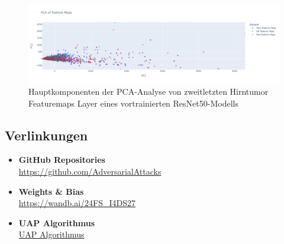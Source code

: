 \begin{figure}[H]
    \centering
    \includegraphics[width=\linewidth]{01-images/06-ending/brain-all-feautremap-pca-model-resnet50.png}
    \caption{Hauptkomponenten der PCA-Analyse von zweitletzten Hirntumor Featuremaps Layer eines vortrainierten ResNet50-Modells}
    \label{fig:brain-feautremap-pca-model-resnet50}
\end{figure}

\newpage

\subsection*{Verlinkungen}

\begin{itemize}

    \item \textbf{GitHub Repositories} \\
    \href{https://github.com/AdversarialAttacks}{https://github.com/AdversarialAttacks}
    
    \item \textbf{Weights \& Bias} \\
    \href{https://wandb.ai/24FS_I4DS27}
    {https://wandb.ai/24FS\_I4DS27}
    
    \item \textbf{UAP Algorithmus} \\
    \href{https://github.com/AdversarialAttacks/report/blob/main/01-images/05-UAP_ALG.png}{UAP Algorithmus}
    
\end{itemize}
